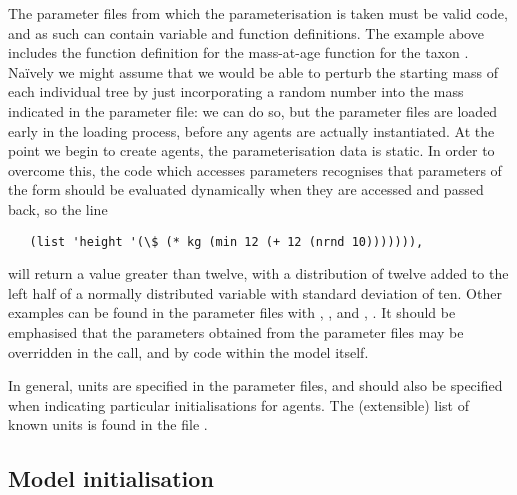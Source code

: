 The parameter files from which the parameterisation is taken must be valid
\Scheme code, and as such can contain variable and function definitions.  The
example above includes the function definition for the mass-at-age
function for the taxon .  Na\"ively we might
assume that we would be able to perturb the starting mass of each
individual tree by just incorporating a random number into the mass
indicated in the parameter file: we can do so, but the parameter files
are loaded early in the loading process, before any agents are
actually instantiated.  At the point we begin to create agents, the
parameterisation data is static.  In order to overcome this, the code
which accesses parameters recognises that parameters of the form
\symb{(\$ \ldots )} should be evaluated dynamically when they are
accessed and passed back, so the line

\begin{verbatim}
   (list 'height '(\$ (* kg (min 12 (+ 12 (nrnd 10))))))),
\end{verbatim}

will return a value greater than twelve, with a distribution of twelve
added to the left half of a normally distributed variable with standard deviation
of ten.  Other examples can be found in the parameter files with
, ,
 and , . 
It should be emphasised that the parameters obtained from the
parameter files may be overridden in the  call, and by
code within the model itself.

In general, units are specified in the parameter
files, and should also be specified when indicating particular
initialisations for agents.  The (extensible) list of known units is
found in the file .


\subsection{Model initialisation}

